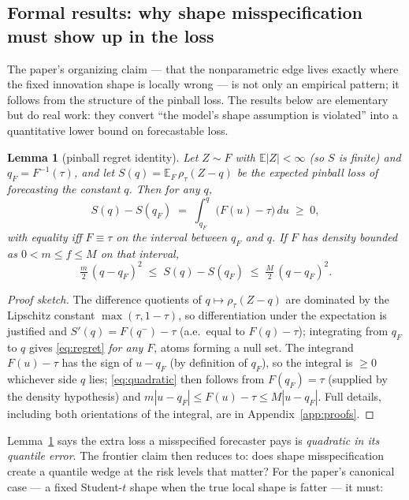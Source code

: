 \documentclass[11pt]{article}
\newtheorem{lemma}{Lemma}
\theoremstyle{remark}
\begin{document}
\subsection{Formal results: why shape misspecification must show up in
the loss}\label{sec:theory}

The paper's organizing claim --- that the nonparametric edge lives
exactly where the fixed innovation shape is locally wrong --- is not
only an empirical pattern; it follows from the structure of the pinball
loss. The results below are elementary but do real work: they convert
``the model's shape assumption is violated'' into a quantitative lower
bound on forecastable loss.

\begin{lemma}[pinball regret identity]\label{lem:regret}
Let $Z \sim F$ with $\mathbb{E}|Z| < \infty$ (so $S$ is finite) and
$q_F = F^{-1}(\tau)$, and let
$S(q) = \mathbb{E}_F\,\rho_\tau(Z - q)$ be the expected pinball loss of
forecasting the constant $q$. Then for any $q$,
\begin{equation}
S(q) - S(q_F) \;=\; \int_{q_F}^{q} \big(F(u) - \tau\big)\,du \;\ge\; 0,
\label{eq:regret}
\end{equation}
with equality iff $F \equiv \tau$ on the interval between $q_F$ and $q$.
If $F$ has density bounded as $0 < m \le f \le M$ on that interval,
\begin{equation}
\tfrac{m}{2}\,(q - q_F)^2 \;\le\; S(q) - S(q_F) \;\le\;
\tfrac{M}{2}\,(q - q_F)^2 .
\label{eq:quadratic}
\end{equation}
\end{lemma}
\begin{proof}[Proof sketch]
The difference quotients of $q\mapsto\rho_\tau(Z-q)$ are dominated by
the Lipschitz constant $\max(\tau,1-\tau)$, so differentiation under the
expectation is justified and $S'(q)=F(q^-)-\tau$ (a.e.\ equal to
$F(q)-\tau$); integrating from $q_F$ to $q$ gives \eqref{eq:regret}
\emph{for any $F$}, atoms forming a null set. The integrand
$F(u)-\tau$ has the sign of $u-q_F$ (by definition of $q_F$), so the
integral is $\ge 0$ whichever side $q$ lies; \eqref{eq:quadratic} then
follows from $F(q_F)=\tau$ (supplied by the density hypothesis) and
$m|u-q_F|\le F(u)-\tau\le M|u-q_F|$. Full details, including both
orientations of the integral, are in Appendix~\ref{app:proofs}.
\end{proof}

Lemma~\ref{lem:regret} says the extra loss a misspecified forecaster
pays is \emph{quadratic in its quantile error}. The frontier claim then
reduces to: does shape misspecification create a quantile wedge at the
risk levels that matter? For the paper's canonical case --- a fixed
Student-$t$ shape when the true local shape is fatter --- it must:
\end{document}
